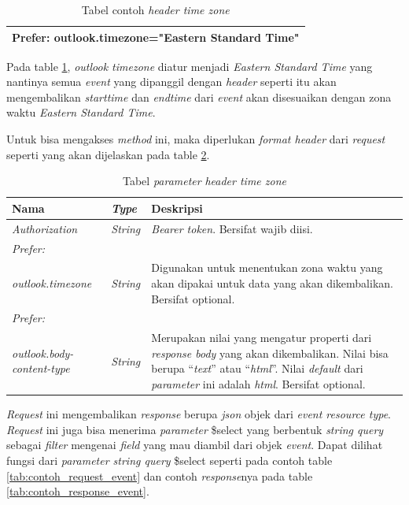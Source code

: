 \begin{table}[H]
	\centering 
	\caption{Tabel contoh \textit{header time zone}}
	\label{tab:contoh_header_time_zone}
	\begin{tabular}{|p{9cm}|}
	\toprule
	 Prefer: outlook.timezone="Eastern Standard Time" \\
	\bottomrule
	\end{tabular}  
\end{table}

Pada table \ref{tab:contoh_header_time_zone}, \textit{outlook timezone} diatur menjadi \textit{Eastern Standard Time} yang nantinya semua \textit{event} yang dipanggil dengan \textit{header} seperti itu akan mengembalikan \textit{starttime} dan \textit{endtime} dari \textit{event} akan disesuaikan dengan zona waktu \textit{Eastern Standard Time}. 

Untuk bisa mengakses \textit{method} ini, maka diperlukan \textit{format header} dari \textit{request} seperti yang akan dijelaskan pada table \ref{tab:parameter_header_time_zone}. 

\begin{table}[H]
	\centering 
	\caption{Tabel \textit{parameter} \textit{header time zone}}
	\label{tab:parameter_header_time_zone}
	\begin{tabular}{|p{3cm}|p{3cm}|p{9cm}|}
	\toprule
	 \textbf{Nama} & \textbf{\textit{Type}} & \textbf{Deskripsi}\\ \hline
	 \textit{Authorization} & \textit{String} & \textit{Bearer {token}}. Bersifat wajib diisi. \\ \hline
	 \textit{Prefer:}& & \\
	 \textit{outlook.timezone} & \textit{String} & Digunakan untuk menentukan zona waktu yang akan dipakai untuk data yang akan dikembalikan. Bersifat optional. \\ \hline
	 \textit{Prefer:}& & \\
	 \textit{outlook.body-content-type} & \textit{String} & Merupakan nilai yang mengatur properti dari \textit{response body} yang akan dikembalikan. Nilai bisa berupa ``\textit{text}'' atau ``\textit{html}''. Nilai \textit{default} dari \textit{parameter} ini adalah \textit{html}. Bersifat optional. \\ \hline
	\bottomrule
	\end{tabular}  
\end{table}

\textit{Request} ini mengembalikan \textit{response} berupa \textit{json} objek dari \textit{event resource type}. \textit{Request} ini juga bisa menerima \textit{parameter} \$select yang berbentuk \textit{string query} sebagai \textit{filter} mengenai \textit{field} yang mau diambil dari objek \textit{event}. Dapat dilihat fungsi dari \textit{parameter string query} \$select seperti pada contoh table \ref{tab:contoh_request_event} dan contoh \textit{response}nya pada table \ref{tab:contoh_response_event}. 

